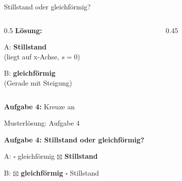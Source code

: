 \documentclass[aspectratio=169,11pt]{beamer}
\begin{document}
\begin{frame}{Stillstand oder gleichförmig?}
    \begin{columns}
        \begin{column}{0.5\textwidth}
            \textcolor{loesung}{\textbf{Lösung:}}

            \vspace{1em}
            \textcolor{loesung}{A: \textbf{Stillstand}\\
            (liegt auf x-Achse, $s = 0$)}

            \vspace{1em}
            \textcolor{loesung}{B: \textbf{gleichförmig}\\
            (Gerade mit Steigung)}
        \end{column}
        \begin{column}{0.45\textwidth}
        \end{column}
    \end{columns}

    \vspace{0.3em}
    \begin{abhinweis}
        \textbf{Aufgabe 4:} Kreuze an
    \end{abhinweis}
\end{frame}

\begin{frame}{Musterlösung: Aufgabe 4}
    \begin{center}
        \begin{mlbox}
            \textbf{Aufgabe 4: Stillstand oder gleichförmig?}

            \vspace{0.5em}
            A: $\square$ gleichförmig \quad \textcolor{loesung}{$\boxtimes$ \textbf{Stillstand}}

            \vspace{0.3em}
            B: \textcolor{loesung}{$\boxtimes$ \textbf{gleichförmig}} \quad $\square$ Stillstand
        \end{mlbox}
    \end{center}
\end{frame}
\end{document}

